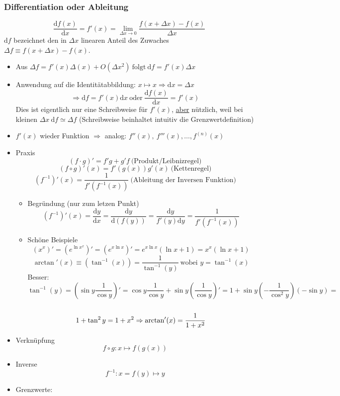 \documentclass[a4paper]{scrartcl}
\theoremstyle{definition}
\theoremstyle{plain}
\theoremstyle{remark}
\begin{document}
\subsubsection{Differentiation oder Ableitung}
\label{sec-2-2-2}
\[\frac{\mathrm{d}f(x)}{\mathrm{d}x} = f'(x) = \lim_{\Delta x \to 0} \frac{f(x + \Delta x) - f(x)}{\Delta x}\]
$\mathrm{d}f$ bezeichnet den in $\Delta x$ linearen Anteil des Zuwaches $\Delta f\equiv f(x + \Delta x) - f(x)$.
\begin{itemize}
\item Aus $\Delta f = f'(x)\Delta(x) + O(\Delta x^2)~\text{folgt}~\mathrm{d}f = f'(x)\Delta x$
\item Anwendung auf die Identitätabbildung: $x \mapsto x \Rightarrow \mathrm{d}x = \Delta x$
      \[\Rightarrow \mathrm{d}f = f'(x)\mathrm{d}x~\text{oder}~\frac{\mathrm{d}f(x)}{\mathrm{d}x} = f'(x)\]
      Dies ist eigentlich nur eine Schreibweise für $f'(x)$, \uline{aber} nützlich, weil bei kleinen $\Delta x~\mathrm{d}f \simeq \Delta f$ (Schreibweise beinhaltet intuitiv die Grenzwertdefinition)
\item $f'(x)$ wieder Funktion $\Rightarrow$ analog: $f''(x),~f'''(x),\ldots,f^{(n)}(x)$
\item Praxis
\[(f\cdot g)' = f' g + g' f~\text{(Produkt/Leibnizregel)}\]
\[(f \circ g)'(x) = f'(g(x))g'(x)~\text{(Kettenregel)}\]
\[(f^{-1})'(x) = \frac{1}{f'(f^{-1}(x))}~\text{(Ableitung der Inversen Funktion)}\]
\begin{itemize}
\item Begründung (nur zum letzen Punkt)
\[(f^{-1})'(x) = \frac{\mathrm{d}y}{\mathrm{d}x} = \frac{\mathrm{d}y}{\mathrm{d}(f(y))} = \frac{\mathrm{d}y}{f'(y)\mathrm{d}y} = \frac{1}{f'(f^{-1}(x))}\]
\item Schöne Beispiele
\[(x^x)' = (e^{\ln{x^x}})' = (e^{x\ln{x}})' = e^{x\ln{x}}(\ln{x} + 1) = x^x(\ln{x} + 1)\]
\[\arctan'(x) \equiv (\tan^{-1}(x)) = \frac{1}{\tan^{-1}(y)}~\text{wobei $y = \tan^{-1}(x)$}\]
Besser: \[\tan^{-1}(y) = (\sin{y} \frac{1}{\cos{y}})' = \cos{y} \frac{1}{\cos{y}} + \sin{y}(\frac{1}{\cos{y}})' = 1 + \sin{y}(-\frac{1}{\cos^2{y}})(-\sin{y}) = \] \\
        \[ 1 + \tan^2{y} = 1 + x^2 \\ \Rightarrow \arctan'(x) = \frac{1}{1 + x^2}\]
\end{itemize}
\item Verknüpfung \[f\circ g: x\mapsto f(g(x))\]
\item Inverse \[f^{-1} : x=f(y)\mapsto y\]
\item Grenzwerte:

\end{itemize}
\end{document}
